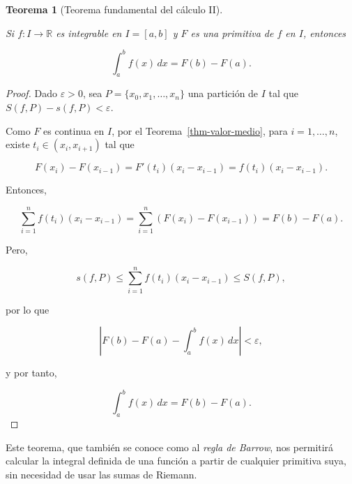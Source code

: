 \documentclass[
  a4paper,
]{scrreport}
\theoremstyle{plain}
\newtheorem{theorem}{Teorema}[chapter]
\theoremstyle{definition}
\theoremstyle{plain}
\theoremstyle{plain}
\theoremstyle{definition}
\theoremstyle{definition}
\theoremstyle{remark}
\begin{document}
\begin{theorem}[Teorema fundamental del cálculo
II]\protect\hypertarget{thm-teorema-fundamental-calculo-2}{}\label{thm-teorema-fundamental-calculo-2}

Si \(f:I\to\mathbb{R}\) es integrable en \(I=[a,b]\) y \(F\) es una
primitiva de \(f\) en \(I\), entonces

\[
\int_a^b f(x)\,dx = F(b)-F(a).
\]

\end{theorem}

\begin{tcolorbox}[enhanced jigsaw, titlerule=0mm, arc=.35mm, colframe=quarto-callout-note-color-frame, bottomrule=.15mm, opacitybacktitle=0.6, rightrule=.15mm, coltitle=black, colback=white, toprule=.15mm, title=\textcolor{quarto-callout-note-color}{\faInfo}\hspace{0.5em}{Demostración}, leftrule=.75mm, bottomtitle=1mm, opacityback=0, breakable, colbacktitle=quarto-callout-note-color!10!white, toptitle=1mm, left=2mm]

\begin{proof}
Dado \(\varepsilon>0\), sea \(P=\{x_0,x_1,\ldots,x_n\}\) una partición
de \(I\) tal que \(S(f,P)-s(f,P)<\varepsilon\).

Como \(F\) es continua en \(I\), por el Teorema~\ref{thm-valor-medio},
para \(i=1,\ldots,n\), existe \(t_i \in (x_i,x_{i+1})\) tal que

\[
F(x_i)-F(x_{i-1}) = F'(t_i)(x_i-x_{i-1}) = f(t_i)(x_i-x_{i-1}).
\]

Entonces,

\[
\sum_{i=1}^n f(t_i)(x_i-x_{i-1}) = \sum_{i=1}^n (F(x_i)-F(x_{i-1})) = F(b)-F(a).
\]

Pero,

\[
s(f,P)\leq \sum_{i=1}^n f(t_i)(x_i-x_{i-1}) \leq S(f,P),
\]

por lo que

\[
\left|F(b)-F(a)-\int_a^b f(x)\,dx\right|<\varepsilon,
\]

y por tanto,

\[
\int_a^b f(x)\,dx = F(b)-F(a).
\]
\end{proof}

\end{tcolorbox}

Este teorema, que también se conoce como al \emph{regla de Barrow}, nos
permitirá calcular la integral definida de una función a partir de
cualquier primitiva suya, sin necesidad de usar las sumas de Riemann.
\end{document}
